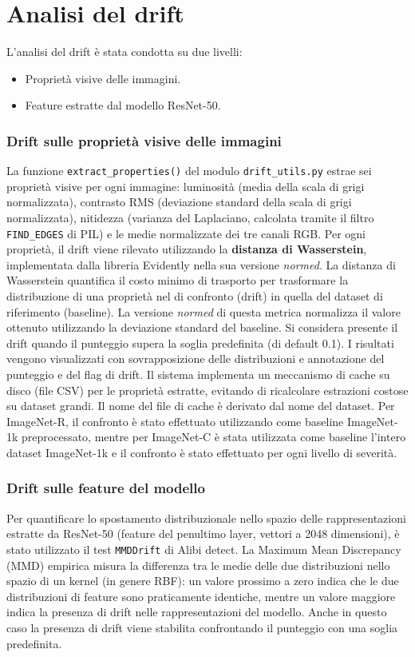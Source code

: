 \section{Analisi del drift}

L'analisi del drift è stata condotta su due livelli: 
\begin{itemize}
	\item Proprietà visive delle immagini.
	\item Feature estratte dal modello ResNet-50.
\end{itemize}
\subsubsection{Drift sulle proprietà visive delle immagini}
La funzione \texttt{extract\_properties()} del modulo \texttt{drift\_utils.py} estrae sei proprietà visive per ogni immagine: luminosità (media della scala di grigi normalizzata), contrasto RMS (deviazione standard della scala di grigi normalizzata), nitidezza (varianza del Laplaciano, calcolata tramite il filtro \texttt{FIND\_EDGES} di PIL) e le medie normalizzate dei tre canali RGB.
Per ogni proprietà, il drift viene rilevato utilizzando la \textbf{distanza di Wasserstein}, implementata dalla libreria Evidently nella sua versione \emph{normed}.
La distanza di Wasserstein quantifica il costo minimo di trasporto per trasformare la distribuzione di una proprietà nel di confronto (drift) in quella del dataset di riferimento (baseline). La versione \emph{normed} di questa metrica normalizza il valore ottenuto utilizzando la deviazione standard del baseline. Si considera presente il drift quando il punteggio supera la soglia predefinita (di default 0.1). I risultati vengono visualizzati con sovrapposizione delle distribuzioni e annotazione del punteggio e del flag di drift. Il sistema implementa un meccanismo di cache su disco (file CSV) per le proprietà estratte, evitando di ricalcolare estrazioni costose su dataset grandi. Il nome del file di cache è derivato dal nome del dataset.
Per ImageNet-R, il confronto è stato effettuato utilizzando come baseline ImageNet-1k preprocessato, mentre per ImageNet-C è stata utilizzata come baseline l'intero
dataset ImageNet-1k e il confronto è stato effettuato per ogni livello di severità.
\subsubsection{Drift sulle feature del modello}
Per quantificare lo spostamento distribuzionale nello spazio delle rappresentazioni estratte da ResNet-50 (feature del penultimo layer, vettori a 2048 dimensioni), è stato utilizzato il test \texttt{MMDDrift} di Alibi detect. La Maximum Mean Discrepancy (MMD) empirica misura la differenza tra le medie delle due distribuzioni nello spazio di un kernel (in genere RBF): un valore prossimo a zero indica che le due distribuzioni di feature sono praticamente identiche, mentre un valore maggiore indica la presenza di drift nelle rappresentazioni del modello. Anche in questo caso la presenza di drift viene stabilita confrontando il punteggio con una soglia predefinita.
